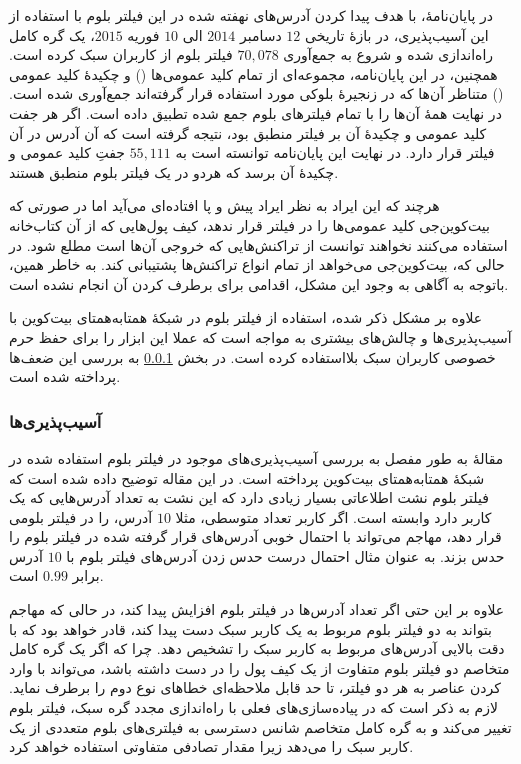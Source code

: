 در پایان‌نامهٔ\cite{Nick2015}، با هدف پیدا کردن آدرس‌های نهفته شده در این فیلتر بلوم با استفاده از این آسیب‌پذیری، در بازهٔ تاریخی $12$ دسامبر $2014$ الی $10$ فوریه $2015$، یک گره کامل راه‌اندازی شده و شروع به جمع‌آوری $70,078$ فیلتر بلوم از کاربران سبک کرده است. همچنین، در این پایان‌نامه، مجموعه‌ای از تمام کلید عمومی‌ها () و چکیدهٔ کلید عمومی () متناظر آن‌ها که در زنجیرهٔ بلوکی مورد استفاده قرار گرفته‌اند جمع‌آوری شده است. در نهایت همهٔ آن‌ها را با تمام فیلتر‌های بلوم جمع شده تطبیق داده است. اگر هر جفت کلید عمومی و چکیدهٔ آن بر فیلتر منطبق بود، نتیجه گرفته است که آن آدرس در آن فیلتر قرار دارد. در نهایت این پایان‌نامه توانسته است به $55,111$ جفتِ کلید عمومی و چکیدهٔ آن برسد که هردو در یک فیلتر بلوم منطبق هستند.

هرچند که این ایراد به نظر ایراد پیش و پا افتاده‌ای می‌آید اما در صورتی که بیت‌کوین‌جی کلید عمومی‌ها را در فیلتر قرار ندهد، کیف پول‌هایی که از آن کتاب‌خانه استفاده می‌کنند نخواهند توانست از تراکنش‌هایی که خروجی آن‌ها  است مطلع شود. در حالی که، بیت‌کوین‌جی می‌خواهد از تمام انواع تراکنش‌ها پشتیبانی کند. به خاطر همین، باتوجه به آگاهی به وجود این مشکل، اقدامی برای برطرف کردن آن انجام نشده است.

علاوه بر مشکل ذکر شده، استفاده از فیلتر بلوم در شبکهٔ همتا‌به‌همتای بیت‌کوین با آسیب‌پذیری‌ها و چالش‌های بیشتری به مواجه است که عملا این ابزار را برای حفظ حرم خصوصی کاربران سبک بلااستفاده کرده است. در بخش \ref{Vulnerabilities} به بررسی این ضعف‌ها پرداخته شده است.

\subsubsection{آسیب‌‌پذیری‌ها }
\label{Vulnerabilities}
مقالهٔ \cite{Gervais2014} به طور مفصل به بررسی آسیب‌پذیری‌های موجود در فیلتر بلوم استفاده شده در شبکهٔ همتا‌به‌همتای بیت‌کوین پرداخته است. در این مقاله توضیح داده شده است که فیلتر بلوم نشت اطلاعاتی بسیار زیادی دارد که این نشت به تعداد آدرس‌هایی که یک کاربر دارد وابسته است. اگر کاربر تعداد متوسطی، مثلا $10$ آدرس، را در فیلتر بلومی قرار دهد، مهاجم می‌تواند با احتمال خوبی آدرس‌های قرار گرفته شده در فیلتر بلوم را حدس بزند. به عنوان مثال احتمال درست حدس زدن آدرس‌های فیلتر بلوم با $10$ آدرس برابر $0.99$ است. 

علاوه بر این حتی اگر تعداد آدرس‌ها در فیلتر‌ بلوم افزایش پیدا کند، در حالی که مهاجم بتواند به دو فیلتر بلوم مربوط به یک کاربر سبک دست پیدا کند، قادر خواهد بود که با دقت بالایی آدرس‌های مربوط به کاربر سبک را تشخیص دهد. چرا که اگر یک گره کامل متخاصم دو فیلتر بلوم متفاوت از یک کیف پول را در دست داشته باشد، می‌تواند با وارد کردن عناصر به هر دو فیلتر، تا حد قابل ملاحظه‌ای خطاهای نوع دوم را برطرف نماید\cite{Nick2015}. لازم به ذکر است که در پیاده‌سازی‌های فعلی با راه‌اندازی مجدد گره سبک، فیلتر بلوم تغییر می‌کند و به گره کامل متخاصم شانس دسترسی به فیلتری‌های بلوم متعددی از یک کاربر سبک را می‌دهد\cite{Gervais2014} زیرا مقدار تصادفی  متفاوتی استفاده خواهد کرد.

